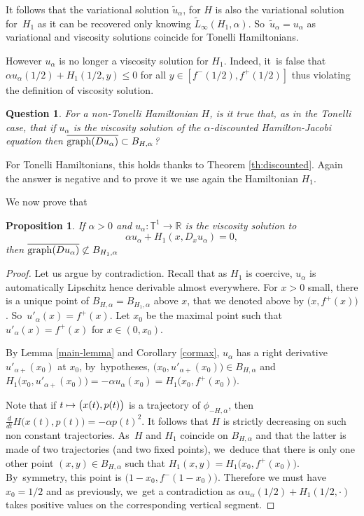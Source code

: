 \documentclass[JEP,XML,SOM,Unicode,NoFloatCountersInSection,published]{cedram}
\newcommand\mto{\mathchoice{\longmapsto}{\mapsto}{\mapsto}{\mapsto}}
\newtheorem{prop}[thm]{Proposition}
\newtheorem{question}{Question}
\theoremstyle{definition}
\newcommand{\R}{\mathbb{R}}
\begin{document}
\begin{appendix}
It follows that the variational solution $\tilde u_\alpha$, for $H$ is also the variational solution for~$H_1$ as it can be recovered only knowing $\widetilde L_\infty(H_1, \alpha)$. So~$\tilde u_\alpha = u_\alpha$ as variational and viscosity solutions coincide for Tonelli Hamiltonians.

However $u_\alpha$ is no longer a viscosity solution for $H_1$. Indeed, it~is false that $\alpha u_\alpha(1/2)+ H_1(1/2,y)\leqslant 0$ for all $y\in [f^-(1/2), f^+(1/2)]$ thus violating the definition of viscosity solution.

\begin{question}\label{quest:2}
For a non-Tonelli Hamiltonian $H$, is it true that, as in the Tonelli case, that if $u_\alpha$ is the viscosity solution of the $\alpha$-discounted Hamilton-Jacobi equation then $\overline{{\rm graph}(Du_\alpha)}\subset B_{H,\alpha}$?
\end{question}

For Tonelli Hamiltonians, this holds thanks to Theorem \ref{th:discounted}. Again the answer is negative and to prove it we use again the Hamiltonian $H_1$.

We now prove that
\begin{prop}\label{A6}
If $\alpha >0$ and $u_\alpha : \mathbb T^1 \to \R$ is the viscosity solution to
\[
\alpha u_\alpha + H_1(x, D_x u_\alpha) =0,
\]
then
$\overline{{\rm graph}(Du_\alpha)}\not\subset B_{H_1,\alpha}$
\end{prop}

\begin{proof}
Let us argue by contradiction. Recall that as $H_1$ is coercive, $u_\alpha$ is automatically Lipschitz hence derivable almost everywhere. For $x>0$ small, there is a unique point of $B_{H,\alpha}=B_{H_1, \alpha}$ above $x$, that we denoted above by $\bigl(x,f^+(x)\bigr)$. So~$u'_\alpha(x) = f^+(x)$. Let $x_0$ be the maximal point such that $u'_\alpha(x) = f^+(x)$ for $x\in (0,x_0)$.

By Lemma \ref{main-lemma} and Corollary \ref{cormax}, $u_\alpha$ has a right derivative $u'_{\alpha+}(x_0) $ at $x_0$, by~hypotheses, $\bigl(x_0,u'_{\alpha+}(x_0)\bigr) \in B_{H,\alpha} $ and $H_1\bigl(x_0,u'_{\alpha+}(x_0)\bigr) =-\alpha u_\alpha(x_0) = H_1\bigl(x_0,f^+(x_0)\bigr)$.

Note that if $t\mto \bigl(x(t),p(t)\bigr)$ is a trajectory of $\phi_{-H, \alpha}$, then $\frac{d}{dt} H\bigl(x(t),p(t)\bigr) = -\alpha p(t)^2$. It follows that $H$ is strictly decreasing on such non constant trajectories. As~$H$ and $H_1$ coincide on $B_{H,\alpha}$ and that the latter is made of two trajectories (and two fixed points), we~deduce that there is only one other point $(x,y) \in B_{H,\alpha}$ such that $H_1(x,y) = H_1\bigl(x_0,f^+(x_0)\bigr)$. By~symmetry, this point is $\bigl(1-x_0, f^-(1-x_0)\bigr)$. Therefore we must have $x_0 = 1/2$ and as previously, we~get a contradiction as $\alpha u_\alpha(1/2) +H_1(1/2,\cdot)$ takes positive values on the corresponding vertical segment.
\end{proof}


\end{appendix}
\end{document}
